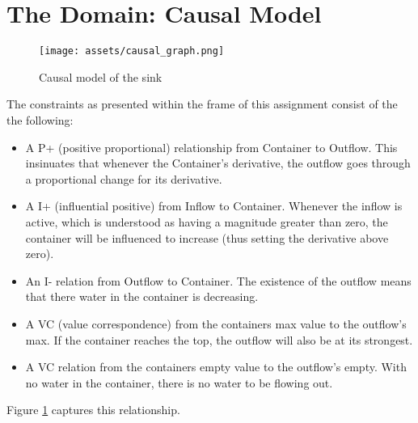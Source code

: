 \section{The Domain: Causal Model}

\begin{figure}
    \texttt{[image: assets/causal\_graph.png]}
    \caption{Causal model of the sink}
    \label{fig:causal_model}
\end{figure}

The constraints as presented within the frame of this assignment consist of the
the following:
\begin{itemize}
    \item A P+ (positive proportional) relationship from Container to Outflow.
    This insinuates that whenever the Container's derivative, the outflow goes
    through a proportional change for its derivative.
    \item A I+ (influential positive) from Inflow to Container. Whenever the
    inflow is active, which is understood as having a magnitude greater than
    zero, the container will be influenced to increase (thus setting the
    derivative above zero).
    \item An I- relation from Outflow to Container. The existence of the outflow
    means that there water in the container is decreasing.
    \item A VC (value correspondence) from the containers max value to the outflow's
    max. If the container reaches the top, the outflow will also be at its strongest.
    \item A VC relation from the containers empty value to the outflow's empty.
    With no water in the container, there is no water to be flowing out.
\end{itemize}

Figure \ref{fig:causal_model} captures this relationship.